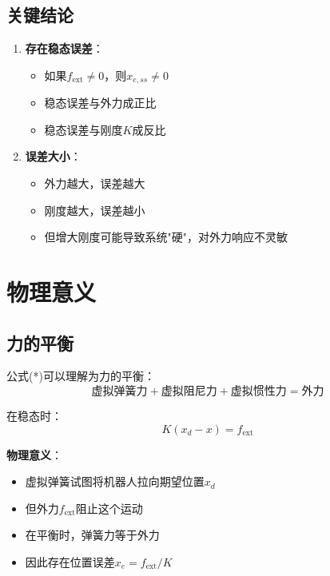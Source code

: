 \documentclass[12pt,a4paper]{article}
\begin{document}
\subsection{关键结论}

\begin{enumerate}
\item \textbf{存在稳态误差}：
\begin{itemize}
\item 如果$f_{\text{ext}} \neq 0$，则$x_{e,ss} \neq 0$
\item 稳态误差与外力成正比
\item 稳态误差与刚度$K$成反比
\end{itemize}

\item \textbf{误差大小}：
\begin{itemize}
\item 外力越大，误差越大
\item 刚度越大，误差越小
\item 但增大刚度可能导致系统"硬"，对外力响应不灵敏
\end{itemize}
\end{enumerate}

\section{物理意义}

\subsection{力的平衡}

公式(*)可以理解为力的平衡：
\begin{equation}
\text{虚拟弹簧力} + \text{虚拟阻尼力} + \text{虚拟惯性力} = \text{外力}
\end{equation}

在稳态时：
\begin{equation}
K(x_d - x) = f_{\text{ext}}
\end{equation}

\textbf{物理意义}：
\begin{itemize}
\item 虚拟弹簧试图将机器人拉向期望位置$x_d$
\item 但外力$f_{\text{ext}}$阻止这个运动
\item 在平衡时，弹簧力等于外力
\item 因此存在位置误差$x_e = f_{\text{ext}}/K$
\end{itemize}
\end{document}
